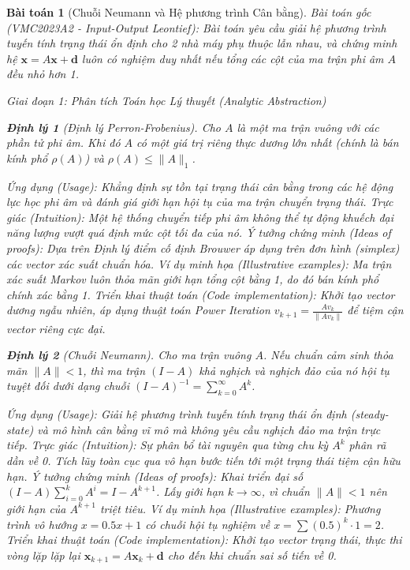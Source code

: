 \documentclass{article}
\newtheorem{baitoan}{Bài toán}
\newtheorem{dinhly}{Định lý}
\begin{document}

\begin{baitoan}[Chuỗi Neumann và Hệ phương trình Cân bằng]
 \emph{Bài toán gốc (VMC2023A2 - Input-Output Leontief):} 
 Bài toán yêu cầu giải hệ phương trình tuyến tính trạng thái ổn định cho 2 nhà máy phụ thuộc lẫn nhau, và chứng minh hệ $\mathbf{x} = A\mathbf{x} + \mathbf{d}$ luôn có nghiệm duy nhất nếu tổng các cột của ma trận phi âm $A$ đều nhỏ hơn 1.

\vspace{0.5em}\noindent\emph{Giai đoạn 1: Phân tích Toán học Lý thuyết (Analytic Abstraction)}
 
\begin{dinhly}[Định lý Perron-Frobenius]
Cho $A$ là một ma trận vuông với các phần tử phi âm. Khi đó $A$ có một giá trị riêng thực dương lớn nhất (chính là bán kính phổ $\rho(A)$) và $\rho(A) \le \|A\|_1$.
\end{dinhly}
\emph{Ứng dụng (Usage):} Khẳng định sự tồn tại trạng thái cân bằng trong các hệ động lực học phi âm và đánh giá giới hạn hội tụ của ma trận chuyển trạng thái.
\emph{Trực giác (Intuition):} Một hệ thống chuyển tiếp phi âm không thể tự động khuếch đại năng lượng vượt quá định mức cột tối đa của nó.
\emph{Ý tưởng chứng minh (Ideas of proofs):} Dựa trên Định lý điểm cố định Brouwer áp dụng trên đơn hình (simplex) các vector xác suất chuẩn hóa.
\emph{Ví dụ minh họa (Illustrative examples):} Ma trận xác suất Markov luôn thỏa mãn giới hạn tổng cột bằng 1, do đó bán kính phổ chính xác bằng 1.
\emph{Triển khai thuật toán (Code implementation):} Khởi tạo vector dương ngẫu nhiên, áp dụng thuật toán Power Iteration $v_{k+1} = \frac{A v_k}{\|A v_k\|}$ để tiệm cận vector riêng cực đại.

\begin{dinhly}[Chuỗi Neumann]
Cho ma trận vuông $A$. Nếu chuẩn cảm sinh thỏa mãn $\|A\| < 1$, thì ma trận $(I - A)$ khả nghịch và nghịch đảo của nó hội tụ tuyệt đối dưới dạng chuỗi $(I - A)^{-1} = \sum_{k=0}^{\infty} A^k$.
\end{dinhly}
\emph{Ứng dụng (Usage):} Giải hệ phương trình tuyến tính trạng thái ổn định (steady-state) và mô hình cân bằng vĩ mô mà không yêu cầu nghịch đảo ma trận trực tiếp.
\emph{Trực giác (Intuition):} Sự phân bổ tài nguyên qua từng chu kỳ $A^k$ phân rã dần về 0. Tích lũy toàn cục qua vô hạn bước tiến tới một trạng thái tiệm cận hữu hạn.
\emph{Ý tưởng chứng minh (Ideas of proofs):} Khai triển đại số $(I-A)\sum_{i=0}^k A^i = I - A^{k+1}$. Lấy giới hạn $k \to \infty$, vì chuẩn $\|A\| < 1$ nên giới hạn của $A^{k+1}$ triệt tiêu.
\emph{Ví dụ minh họa (Illustrative examples):} Phương trình vô hướng $x = 0.5x + 1$ có chuỗi hội tụ nghiệm về $x = \sum (0.5)^k \cdot 1 = 2$.
\emph{Triển khai thuật toán (Code implementation):} Khởi tạo vector trạng thái, thực thi vòng lặp lặp lại $\mathbf{x}_{k+1} = A \mathbf{x}_k + \mathbf{d}$ cho đến khi chuẩn sai số tiến về 0.


\end{baitoan}
\end{document}
